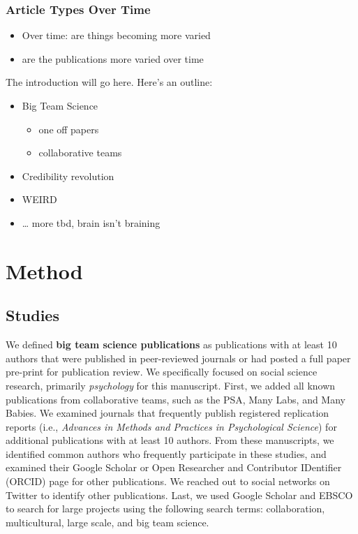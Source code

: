 \documentclass[
  english,
  man]{apa6}
\providecommand{\tightlist}{%
  \setlength{\itemsep}{0pt}\setlength{\parskip}{0pt}}
\begin{document}
\hypertarget{article-types-over-time}{%
\subsubsection{Article Types Over Time}\label{article-types-over-time}}

\begin{itemize}
\tightlist
\item
  Over time: are things becoming more varied
\item
  are the publications more varied over time
\end{itemize}

The introduction will go here. Here's an outline:

\begin{itemize}
\tightlist
\item
  Big Team Science

  \begin{itemize}
  \tightlist
  \item
    one off papers
  \item
    collaborative teams
  \end{itemize}
\item
  Credibility revolution
\item
  WEIRD
\item
  \ldots{} more tbd, brain isn't braining
\end{itemize}

\hypertarget{method}{%
\section{Method}\label{method}}

\hypertarget{studies}{%
\subsection{Studies}\label{studies}}

We defined \textbf{big team science publications} as publications with at least 10 authors that were published in peer-reviewed journals or had posted a full paper pre-print for publication review. We specifically focused on social science research, primarily \emph{psychology} for this manuscript. First, we added all known publications from collaborative teams, such as the PSA, Many Labs, and Many Babies. We examined journals that frequently publish registered replication reports (i.e., \emph{Advances in Methods and Practices in Psychological Science}) for additional publications with at least 10 authors. From these manuscripts, we identified common authors who frequently participate in these studies, and examined their Google Scholar or Open Researcher and Contributor IDentifier (ORCID) page for other publications. We reached out to social networks on Twitter to identify other publications. Last, we used Google Scholar and EBSCO to search for large projects using the following search terms: collaboration, multicultural, large scale, and big team science.
\end{document}
